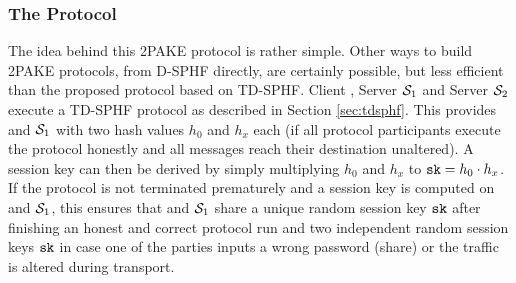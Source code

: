 \subsubsection{The Protocol}\label{sec:2pakeprotocol}
The idea behind this \ac{2PAKE} protocol is rather simple.
Other ways to build \ac{2PAKE} protocols, \eg from \ac{D-SPHF} directly, are certainly possible, but less efficient than the proposed protocol based on \ac{TD-SPHF}.
Client \Client, Server $\mathcal{S}_1$ and Server $\mathcal{S}_2$ execute a \ac{TD-SPHF} protocol as described in Section \ref{sec:tdsphf}.
This provides \Client and $\mathcal{S}_1$ with two hash values $h_0$ and $h_x$ each (if all protocol participants execute the protocol honestly and all messages reach their destination unaltered).
A session key can then be derived by simply multiplying $h_0$ and $h_x$ to $\mathtt{sk}=h_0\cdot h_x$.
If the protocol is not terminated prematurely and a session key is computed on \Client and $\mathcal{S}_1$, this ensures that \Client and $\mathcal{S}_1$ share a unique random session key $\mathtt{sk}$ after finishing an honest and correct protocol run and two independent random session keys $\mathtt{sk}$ in case one of the parties inputs a wrong password (share) or the traffic is altered during transport.


